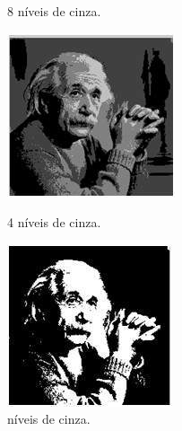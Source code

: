 \documentclass[a4paper, 12pt]{article}
\begin{document}
\begin{figure}[!htb]
	  	\caption{8 níveis de cinza.}
	\endminipage\hspace{1cm}
		\includegraphics[width=\linewidth]{images/4.jpg}
		\caption{4 níveis de cinza.}
  	\endminipage\hspace{1cm}
  		\includegraphics[width=\linewidth]{images/2.jpg}
  		\caption{ níveis de cinza.}
	\endminipage
\end{figure}
\end{document}
